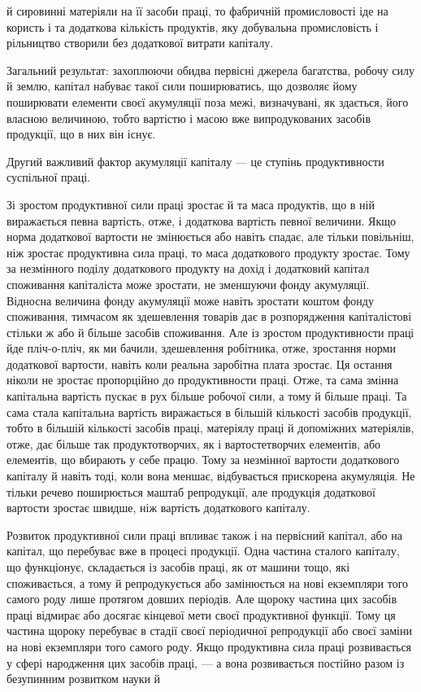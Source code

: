\parcont{}  %
й сировинні матеріяли на її засоби праці, то фабричній промисловості
іде на користь і та додаткова кількість продуктів, яку
добувальна промисловість і рільництво створили без додаткової
витрати капіталу.

Загальний результат: захоплюючи обидва первісні джерела
багатства, робочу силу й землю, капітал набуває такої сили поширюватись,
що дозволяє йому поширювати елементи своєї акумуляції
поза межі, визначувані, як здається, його власною величиною,
тобто вартістю і масою вже випродукованих засобів продукції,
що в них він існує.

Другий важливий фактор акумуляції капіталу — це ступінь
продуктивности суспільної праці.

Зі зростом продуктивної сили праці зростає й та маса продуктів,
що в ній виражається певна вартість, отже, і додаткова вартість
певної величини. Якщо норма додаткової вартости не змінюється
або навіть спадає, але тільки повільніш, ніж зростає
продуктивна сила праці, то маса додаткового продукту зростає.
Тому за незмінного поділу додаткового продукту на дохід і додатковий
капітал споживання капіталіста може зростати, не
зменшуючи фонду акумуляції. Відносна величина фонду акумуляції
може навіть зростати коштом фонду споживання, тимчасом
як здешевлення товарів дає в розпорядження капіталістові
стільки ж або й більше засобів споживання. Але із зростом продуктивности
праці йде пліч-о-пліч, як ми бачили, здешевлення
робітника, отже, зростання норми додаткової вартости, навіть
коли реальна заробітна плата зростає. Ця остання ніколи не
зростає пропорційно до продуктивности праці. Отже, та сама
змінна капітальна вартість пускає в рух більше робочої сили,
а тому й більше праці. Та сама стала капітальна вартість виражається
в більшій кількості засобів продукції, тобто в більшій
кількості засобів праці, матеріялу праці й допоміжних матеріялів,
отже, дає більше так продуктотворчих, як і вартостетворчих
елементів, або елементів, що вбирають у себе працю. Тому за
незмінної вартости додаткового капіталу й навіть тоді, коли
вона меншає, відбувається прискорена акумуляція. Не тільки
речево поширюється маштаб репродукції, але продукція додаткової
вартости зростає швидше, ніж вартість додаткового капіталу.

Розвиток продуктивної сили праці впливає також і на первісний
капітал, або на капітал, що перебуває вже в процесі
продукції. Одна частина сталого капіталу, що функціонує, складається
із засобів праці, як от машини тощо, які споживається,
а тому й репродукується або замінюється на нові екземпляри
того самого роду лише протягом довших періодів. Але щороку
частина цих засобів праці відмирає або досягає кінцевої мети
своєї продуктивної функції. Тому ця частина щороку перебуває
в стадії своєї періодичної репродукції або своєї заміни на нові
екземпляри того самого роду. Якщо продуктивна сила праці
розвивається у сфері народження цих засобів праці, — а вона
розвивається постійно разом із безупинним розвитком науки й
\parbreak{}  %

